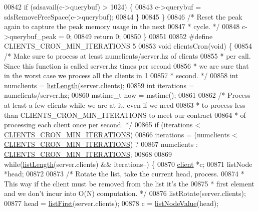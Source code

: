 \begin{DoxyCode}
{{{{{00842         \textcolor{keywordflow}{if} (sdsavail(c->querybuf) > 1024) \{
00843             c->querybuf = sdsRemoveFreeSpace(c->querybuf);
00844         \}
00845     \}
00846     \textcolor{comment}{/* Reset the peak again to capture the peak memory usage in the next}
00847 \textcolor{comment}{     * cycle. */}
00848     c->querybuf\_peak = 0;
00849     \textcolor{keywordflow}{return} 0;
00850 \}
00851 
00852 \textcolor{preprocessor}{#}\textcolor{preprocessor}{define} \textcolor{preprocessor}{CLIENTS\_CRON\_MIN\_ITERATIONS} 5
00853 \textcolor{keywordtype}{void} clientsCron(\textcolor{keywordtype}{void}) \{
00854     \textcolor{comment}{/* Make sure to process at least numclients/server.hz of clients}
00855 \textcolor{comment}{     * per call. Since this function is called server.hz times per second}
00856 \textcolor{comment}{     * we are sure that in the worst case we process all the clients in 1}
00857 \textcolor{comment}{     * second. */}
00858     \textcolor{keywordtype}{int} numclients = \hyperlink{adlist_8h_afde0ab079f934670e82119b43120e94b}{listLength}(server.clients);
00859     \textcolor{keywordtype}{int} iterations = numclients/server.hz;
00860     mstime\_t now = mstime();
00861 
00862     \textcolor{comment}{/* Process at least a few clients while we are at it, even if we need}
00863 \textcolor{comment}{     * to process less than CLIENTS\_CRON\_MIN\_ITERATIONS to meet our contract}
00864 \textcolor{comment}{     * of processing each client once per second. */}
00865     \textcolor{keywordflow}{if} (iterations < \hyperlink{server_8c_a79785342d159d7e8dc4547ffb330835d}{CLIENTS\_CRON\_MIN\_ITERATIONS})
00866         iterations = (numclients < \hyperlink{server_8c_a79785342d159d7e8dc4547ffb330835d}{CLIENTS\_CRON\_MIN\_ITERATIONS}) ?
00867                      numclients : \hyperlink{server_8c_a79785342d159d7e8dc4547ffb330835d}{CLIENTS\_CRON\_MIN\_ITERATIONS};
00868 
00869     \textcolor{keywordflow}{while}(\hyperlink{adlist_8h_afde0ab079f934670e82119b43120e94b}{listLength}(server.clients) && iterations--) \{
00870         \hyperlink{structclient}{client} *c;
00871         listNode *head;
00872 
00873         \textcolor{comment}{/* Rotate the list, take the current head, process.}
00874 \textcolor{comment}{         * This way if the client must be removed from the list it's the}
00875 \textcolor{comment}{         * first element and we don't incur into O(N) computation. */}
00876         listRotate(server.clients);
00877         head = \hyperlink{adlist_8h_aa8dc514bbe217bb2e87c1c77cfa84690}{listFirst}(server.clients);
00878         c = \hyperlink{adlist_8h_af84cae230e7180ebcda1e2736fce9f65}{listNodeValue}(head);
}}}}}
\end{DoxyCode}
